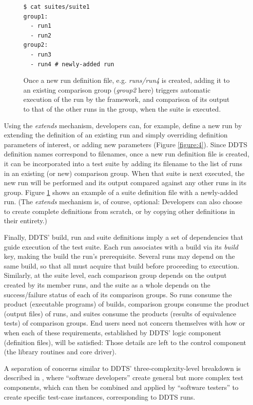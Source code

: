 \documentclass[conference]{IEEEtran}
\begin{document}
\begin{figure}[!t]
\begin{verbatim}
$ cat suites/suite1
group1:
  - run1
  - run2
group2:
  - run3
  - run4 # newly-added run
\end{verbatim}
\caption{Once a new run definition file, e.g. \emph{runs/run4} is created, adding it to an existing comparison group (\emph{group2} here) triggers automatic execution of the run by the framework, and comparison of its output to that of the other runs in the group, when the suite is executed.}
\label{figure:5}
\end{figure}

Using the \emph{extends} mechanism, developers can, for example, define a new run by extending the definition of an existing run and simply overriding definition parameters of interest, or adding new parameters (Figure \ref{figure:4}). Since DDTS definition names correspond to filenames, once a new run definition file is created, it can be incorporated into a test suite by adding its filename to the list of runs in an existing (or new) comparison group. When that suite is next executed, the new run will be performed and its output compared against any other runs in its group. Figure \ref{figure:5} shows an example of a suite definition file with a newly-added run. (The \emph{extends} mechanism is, of course, optional: Developers can also choose to create complete definitions from scratch, or by copying other definitions in their entirety.)

Finally, DDTS' build, run and suite definitions imply a set of dependencies that guide execution of the test suite. Each run associates with a build via its \emph{build} key, making the build the run's prerequisite. Several runs may depend on the same build, so that all must acquire that build before proceeding to execution. Similarly, at the suite level, each comparison group depends on the output created by its member runs, and the suite as a whole depends on the success/failure status of each of its comparison groups. So runs consume the product (executable programs) of builds, comparison groups consume the product (output files) of runs, and suites consume the products (results of equivalence tests) of comparison groups. End users need not concern themselves with how or when each of these requirements, established by DDTS' logic component (definition files), will be satisfied: Those details are left to the control component (the library routines and core driver).

A separation of concerns similar to DDTS' three-complexity-level breakdown is described in \cite{rest}, where ``software developers'' create general but more complex test components, which can then be combined and applied by ``software testers'' to create specific test-case instances, corresponding to DDTS runs.
\end{document}
